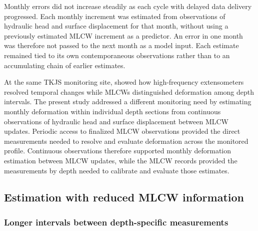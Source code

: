 Monthly errors did not increase steadily as each cycle with delayed data delivery progressed. Each monthly increment was estimated from observations of hydraulic head and surface displacement for that month, without using a previously estimated MLCW increment as a predictor. An error in one month was therefore not passed to the next month as a model input. Each estimate remained tied to its own contemporaneous observations rather than to an accumulating chain of earlier estimates.

At the same TKJS monitoring site, \citet{hung2025_realtime} showed how high-frequency extensometers resolved temporal changes while MLCWs distinguished deformation among depth intervals. The present study addressed a different monitoring need by estimating monthly deformation within individual depth sections from continuous observations of hydraulic head and surface displacement between MLCW updates. Periodic access to finalized MLCW observations provided the direct measurements needed to resolve and evaluate deformation across the monitored profile. Continuous observations therefore supported monthly deformation estimation between MLCW updates, while the MLCW records provided the measurements by depth needed to calibrate and evaluate those estimates.

\subsection{Estimation with reduced MLCW information}
\label{subsec:discussion_reduced_mlcw_information}

\subsubsection{Longer intervals between depth-specific measurements}

